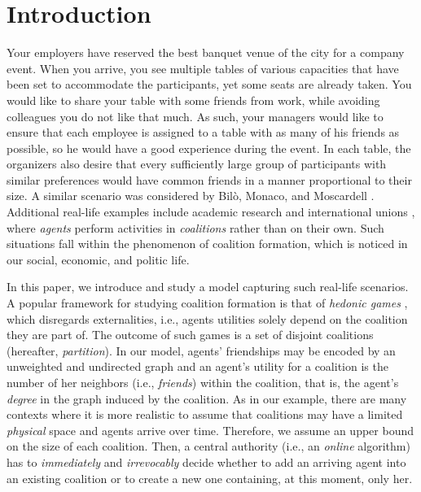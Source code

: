 \documentclass[letterpaper]{article}
\begin{document}
\section{Introduction}
\label{sec:intro}
Your employers have reserved the best banquet venue of the city for a company event. When you arrive, you see multiple tables of various capacities that have been set to accommodate the participants, yet some seats are already taken. You would like to share your table with some friends from work, while avoiding colleagues you do not like that much. As such, your managers would like to ensure that each employee is assigned to a table with as many of his friends as possible, so he would have a good experience during the event. In each table, the organizers also desire that every sufficiently large group of participants with similar preferences would have common friends in a manner proportional to their size. A similar scenario was considered by Bil{\`o}, Monaco, and Moscardell . Additional real-life examples include academic research \cite{alcalde2004researching} and international unions \cite{hosli2001coalition}, where \textit{agents} perform activities in \textit{coalitions} rather than on their own. Such situations fall within the phenomenon of coalition formation, which is noticed in our social, economic, and politic life.

In this paper, we introduce and study a model capturing such real-life scenarios. A popular framework for studying coalition formation is that of \textit{hedonic games} \cite{dreze1980hedonic}, which disregards externalities, i.e., agents utilities solely depend on the coalition they are part of. The outcome of such games is a set of disjoint coalitions (hereafter, \textit{partition}). In our model, agents' friendships may be encoded by an unweighted and undirected graph and an agent's utility for a coalition is the number of her neighbors (i.e., \textit{friends}) within the coalition, that is, the agent's \textit{degree} in the graph induced by the coalition. %
As in our example, there are many contexts where it is more realistic to assume that coalitions may have a limited \textit{physical} space and agents arrive over time. Therefore, we assume an upper bound on the size of each coalition. Then, a central authority (i.e., an \textit{online} algorithm) has to \textit{immediately} and \textit{irrevocably} decide whether to add an arriving agent into an existing coalition or to create a new one containing, at this moment, only her.
\end{document}
